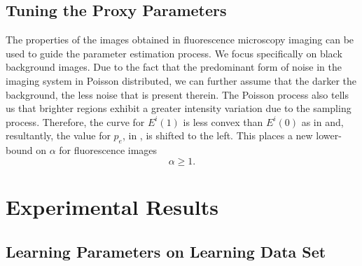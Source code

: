 \documentclass[10pt, journal, letterpaper, onecolumn, draftcls]{IEEEtran}
\begin{document}
\subsection{Tuning the Proxy Parameters}
The properties of the images obtained in fluorescence microscopy imaging can be used to guide the parameter estimation process. We focus specifically on black background images. Due to the fact that the predominant form of noise in the imaging system in Poisson distributed, we can further assume that the darker the background, the less noise that is present therein. The Poisson process also tells us that brighter regions exhibit a greater intensity variation due to the sampling process. Therefore, the curve for $E^i(1)$ is less convex than $E^i(0)$ as in  and, resultantly, the value for $p_e$, in , is shifted to the left. This places a new lower-bound on $\alpha$ for fluorescence images
\begin{equation}
	\alpha \geq 1.
	\label{eq:alphalowerboundFM}
\end{equation}

\section{Experimental Results}
\blindtext

\subsection{Learning Parameters on Learning Data Set}
\blindtext
\end{document}

